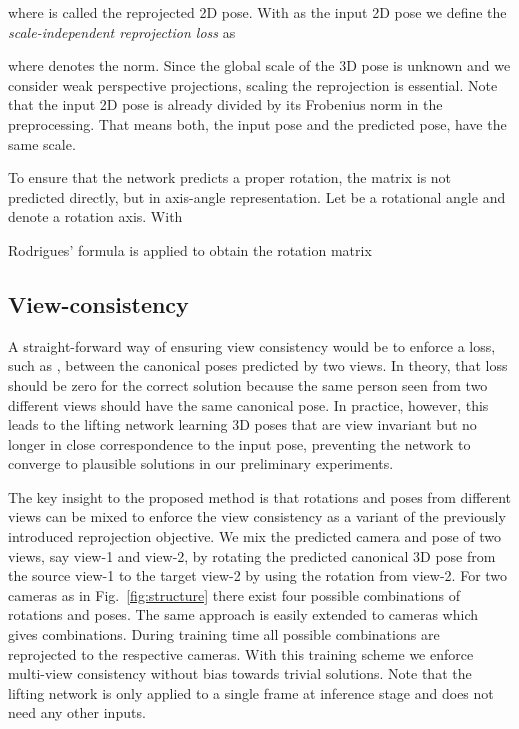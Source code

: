 \documentclass[final]{cvpr}
\begin{document}
where  is called the reprojected 2D pose.
With  as the input 2D pose we define the \textit{scale-independent reprojection loss} as

where  denotes the  norm.
Since the global scale of the 3D pose is unknown and we consider weak perspective projections, scaling the reprojection  is essential.
Note that the input 2D pose  is already divided by its Frobenius norm in the preprocessing.
That means both, the input pose and the predicted pose, have the same scale.

To ensure that the network predicts a proper rotation, the matrix  is not predicted directly, but in axis-angle representation.
Let  be a rotational angle and  denote a rotation axis.
With

Rodrigues' formula is applied to obtain the rotation matrix


\subsection{View-consistency}
\label{sec:view_consistency}
A straight-forward way of ensuring view consistency would be to enforce a loss, such as , between the canonical poses predicted by two views. 
In theory, that loss should be zero for the correct solution because the same person seen from two different views should have the same canonical pose.
In practice, however, this leads to the lifting network learning 3D poses that are view invariant but no longer in close correspondence to the input pose, preventing the network to converge to plausible solutions in our preliminary experiments.

The key insight to the proposed method is that rotations and poses from different views can be mixed to enforce the view consistency as a variant of the previously introduced reprojection objective. 
We mix the predicted camera and pose of two views, say view-1 and view-2, by rotating the predicted canonical 3D pose from the source view-1 to the target view-2 by using the rotation from view-2.
For two cameras as in Fig.~\ref{fig:structure} there exist four possible combinations of rotations and poses.
The same approach is easily extended to  cameras which gives  combinations.
During training time all possible combinations are reprojected to the respective cameras.
With this training scheme we enforce multi-view consistency without bias towards trivial solutions.
Note that the lifting network is only applied to a single frame at inference stage and does not need any other inputs.
\end{document}
